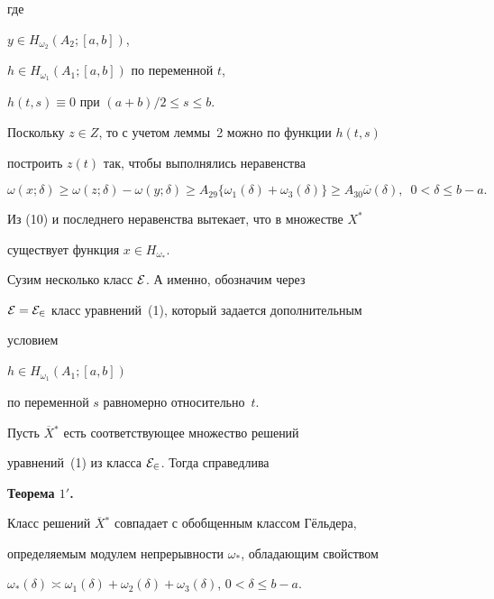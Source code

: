 \begin{pf}
где


$y\in H_{\omega_2}(A_2;[a,b])$,


$h\in H_{\omega_1}(A_1;[a,b])$ по переменной $t$,


$h(t,s)\equiv 0$ при $(a+b)/2\leq s\leq b$.


Поскольку $z\in Z$, то с учетом леммы~2 можно по функции $h(t,s)$


построить $z(t)$ так, чтобы выполнялись неравенства


$$


\omega(x;\delta)\geq \omega(z;\delta)-\omega(y;\delta)\geq A_{29} \bigl\{


\omega_1(\delta)+\omega_3(\delta)\bigr\}\geq


A_{30} \overline{\omega}(\delta),\ \; 0<\delta\leq b-a.


$$


Из (10) и последнего неравенства вытекает, что в множестве $X^*$


существует функция $x\in H_{\omega_*}$.


\end{pf}





Сузим несколько класс $\cal{E}$. А именно, обозначим через


$\cal{E}=\cal{E}_2$ класс уравнений~(1), который задается дополнительным


условием


$h\in H_{\omega_1}(A_1;[a,b])$


по переменной $s$ равномерно относительно~$t$.





Пусть $\overline{X}{}^*$ есть соответствующее множество решений


уравнений~(1) из класса $\cal{E}_2$. Тогда справедлива


\medskip





{\bf Теорема $1'$.} {\it


Класс решений $\overline{X}{}^*$ совпадает с обобщенным классом Г\"ельдера,


определяемым модулем непрерывности $\omega_*$, обладающим свойством}


$\omega_*(\delta)\asymp \omega_1(\delta)+\omega_2(\delta)+


\omega_3(\delta)$, $0<\delta\leq b-a$.


\medskip





